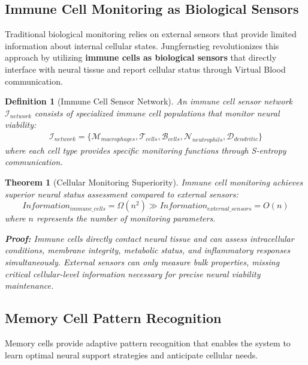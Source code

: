 \documentclass[12pt,a4paper]{article}
\newtheorem{theorem}{Theorem}
\newtheorem{definition}{Definition}
\begin{document}
\subsection{Immune Cell Monitoring as Biological Sensors}

Traditional biological monitoring relies on external sensors that provide limited information about internal cellular states. Jungfernstieg revolutionizes this approach by utilizing \textbf{immune cells as biological sensors} that directly interface with neural tissue and report cellular status through Virtual Blood communication.

\begin{definition}[Immune Cell Sensor Network]
An immune cell sensor network $\mathcal{I}_{network}$ consists of specialized immune cell populations that monitor neural viability:
\begin{align}
\mathcal{I}_{network} = \{\mathcal{M}_{macrophages}, \mathcal{T}_{cells}, \mathcal{B}_{cells}, \mathcal{N}_{neutrophils}, \mathcal{D}_{dendritic}\}
\end{align}
where each cell type provides specific monitoring functions through S-entropy communication.
\end{definition}

\begin{theorem}[Cellular Monitoring Superiority]
Immune cell monitoring achieves superior neural status assessment compared to external sensors:
\begin{equation}
Information_{immune\_cells} = \Omega(n^2) \gg Information_{external\_sensors} = O(n)
\end{equation}
where $n$ represents the number of monitoring parameters.

\textbf{Proof:}
Immune cells directly contact neural tissue and can assess intracellular conditions, membrane integrity, metabolic status, and inflammatory responses simultaneously. External sensors can only measure bulk properties, missing critical cellular-level information necessary for precise neural viability maintenance.
\end{theorem}

\subsection{Memory Cell Pattern Recognition}

Memory cells provide adaptive pattern recognition that enables the system to learn optimal neural support strategies and anticipate cellular needs.
\end{document}
